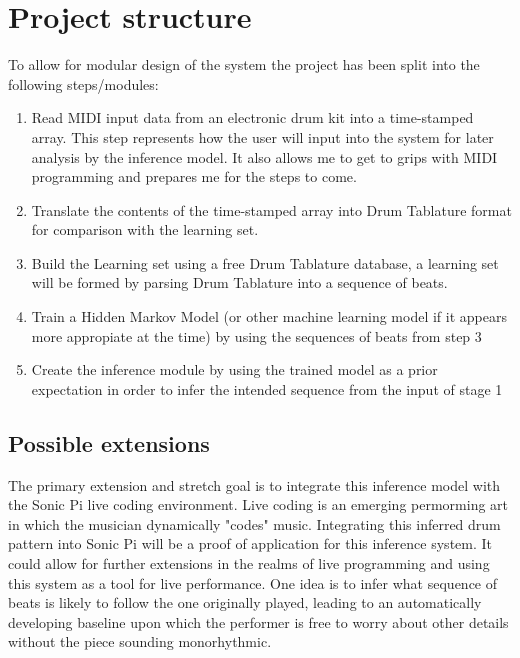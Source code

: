 \documentclass[12pt,a4]{article}
\begin{document}
	\section{\label{sec:ProjectStructure}Project structure}
To allow for modular design of the system the project has been split into the following steps/modules:
		\begin{enumerate}
			\item Read MIDI input data from an electronic drum kit into a time-stamped array. This step represents how the user will input into the system for later analysis by the inference model. It also allows me to get to grips with MIDI programming and prepares me for the steps to come.
			\item Translate the contents of the time-stamped array into Drum Tablature format for comparison with the learning set.
			\item Build the Learning set using a free Drum Tablature database, a learning set will be formed by parsing Drum Tablature into a sequence of beats.
			\item Train a Hidden Markov Model (or other machine learning model if it appears more appropiate at the time) by using the sequences of beats from step 3
			\item Create the inference module by using the trained model as a prior expectation in order to infer the intended sequence from the input of stage 1
		\end{enumerate}

		\subsection{Possible extensions}
The primary extension and stretch goal is to integrate this inference model with the Sonic Pi live coding environment. Live coding is an emerging permorming art in which the musician dynamically "codes" music. Integrating this inferred drum pattern into Sonic Pi will be a proof of application for this inference system. It could allow for further extensions in the realms of live programming and using this system as a tool for live performance. One idea is to infer what sequence of beats is likely to follow the one originally played, leading to an automatically developing baseline upon which the performer is free to worry about other details without the piece sounding monorhythmic.
\end{document}
